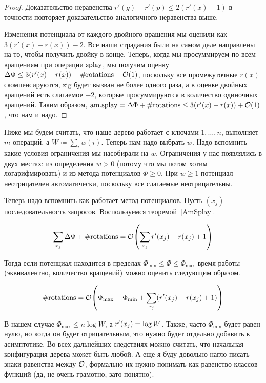 \begin{proof}
	Доказательство неравенства $r'(g) + r'(p) \leq 2(r'(x) - 1)$ в точности повторяет доказательство аналогичного неравенства выше.

	Изменения потенциала от каждого двойного вращения мы оценили как $3(r'(x) - r(x)) - 2$. Все наши страдания были на самом деле направлены на то, чтобы получить двойку в конце. Теперь, когда мы просуммируем по всем вращениям при операции $\operatorname{splay}$, мы получим оценку $\Delta\Phi \leq 3(r'(x) - r(x)) - \#\text{rotations} + \mathcal{O}(1)$, поскольку все промежуточные $r(x)$ скомпенсируются, zig будет вызван не более одного раза, а в оценке двойных вращений есть слагаемое $-2$, которые просуммируются в количество одиночных вращений. Таким образом, $\text{am.splay} = \Delta\Phi + \#\text{rotations} \leq 3(r'(x) - r(x)) + \mathcal{O}(1)$, что нам и надо.
\end{proof}

Ниже мы будем считать, что наше дерево работает с ключами $1, \ldots, n$, выполняет $m$ операций, а $W \coloneqq \sum_i w(i)$. Теперь нам надо выбрать $w$. Надо вспомнить какие условия ограничения мы насобирали на $w$. Ограничения у нас появлялись в двух местах: из определения $w > 0$ (потому что мы потом хотим логарифмировать) и из метода потенциалов $\Phi \geq 0$. При $w \geq 1$ потенциал неотрицателен автоматически, поскольку все слагаемые неотрицательны.

Теперь надо вспомнить как работает метод потенциалов. Пусть $(x_j)$~--- последовательность запросов. Воспользуемся теоремой~\ref{AmSplay}.

\begin{equation*}
	\sum_{x_j} \Delta\Phi + \#\text{rotations} = \BigO \parens*{\sum_{x_j} r'(x_j) - r(x_j) + 1}	
\end{equation*}

Тогда если потенциал находится в пределах $\Phi_{\min} \leq \Phi \leq \Phi_{\max}$ время работы (эквивалентно, количество вращений) можно оценить следующим образом.

\begin{equation}\label{PotentialMethod}
	\#\text{rotations} = \BigO \parens*{\Phi_{\max} - \Phi_{\min} + \sum_{x_j} \parens*{r' \parens*{x_j} - r \parens*{x_j} + 1}}
\end{equation}

В нашем случае $\Phi_{\max} \leq n \log W$, а $r' \parens*{x_j} = \log W$. Также, часто $\Phi_{\min}$ будет равен нулю, но когда он будет отрицательным, это нужно будет отдельно добавить к асимптотике. Во всех дальнейших следствиях можно считать, что начальная конфигурация дерева может быть любой. А еще я буду довольно нагло писать знаки равенства между $\mathcal{O}$, формально их нужно понимать как равенство классов функций (да, не очень грамотно, зато понятно).

